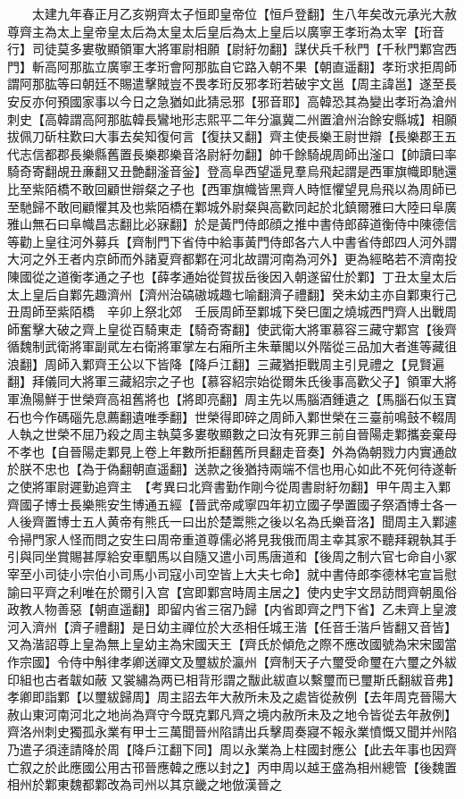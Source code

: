 　　太建九年春正月乙亥朔齊太子恒即皇帝位【恒戶登翻】生八年矣改元承光大赦尊齊主為太上皇帝皇太后為太皇太后皇后為太上皇后以廣寧王孝珩為太宰【珩音行】司徒莫多婁敬顯領軍大將軍尉相願【尉紆勿翻】謀伏兵千秋門【千秋門鄴宫西門】斬高阿那肱立廣寧王孝珩會阿那肱自它路入朝不果【朝直遥翻】孝珩求拒周師謂阿那肱等曰朝廷不賜遣擊賊豈不畏孝珩反邪孝珩若破宇文邕【周主諱邕】遂至長安反亦何預國家事以今日之急猶如此猜忌邪【邪音耶】高韓恐其為變出孝珩為滄州刺史【高韓謂高阿那肱韓長鸞地形志熙平二年分瀛冀二州置滄州治餘安縣城】相願拔佩刀斫柱歎曰大事去矣知復何言【復扶又翻】齊主使長樂王尉世辯【長樂郡王五代志信都郡長樂縣舊置長樂郡樂音洛尉紆勿翻】帥千餘騎覘周師出滏口【帥讀曰率騎奇寄翻覘丑亷翻又丑艶翻滏音釡】登高阜西望遥見羣烏飛起謂是西軍旗幟即馳還比至紫陌橋不敢回顧世辯粲之子也【西軍旗幟皆黑齊人時恇懼望見烏飛以為周師已至馳歸不敢囘顧懼其及也紫陌橋在鄴城外尉粲與高歡同起於北鎮爾雅曰大陸曰阜廣雅山無石曰阜幟昌志翻比必寐翻】於是黃門侍郎顔之推中書侍郎薛道衡侍中陳德信等勸上皇往河外募兵【齊制門下省侍中給事黃門侍郎各六人中書省侍郎四人河外謂大河之外王者内京師而外諸夏齊都鄴在河北故謂河南為河外】更為經略若不濟南投陳國從之道衡孝通之子也【薛孝通始從賀拔岳後因入朝遂留仕於鄴】丁丑太皇太后太上皇后自鄴先趣濟州【濟州治碻磝城趣七喻翻濟子禮翻】癸未幼主亦自鄴東行己丑周師至紫陌橋　辛卯上祭北郊　壬辰周師至鄴城下癸巳圍之燒城西門齊人出戰周師奮擊大破之齊上皇從百騎東走【騎奇寄翻】使武衛大將軍慕容三藏守鄴宫【後齊循魏制武衛將軍副貮左右衛將軍掌左右廂所主朱華閣以外階從三品加大者進等藏徂浪翻】周師入鄴齊王公以下皆降【降戶江翻】三藏猶拒戰周主引見禮之【見賢遍翻】拜儀同大將軍三藏紹宗之子也【慕容紹宗始從爾朱氏後事高歡父子】領軍大將軍漁陽鮮于世榮齊高祖舊將也【將即亮翻】周主先以馬腦酒鍾遺之【馬腦石似玉寶石也今作碼碯先息薦翻遺唯季翻】世榮得即碎之周師入鄴世榮在三臺前鳴鼓不輟周人執之世榮不屈乃殺之周主執莫多婁敬顯數之曰汝有死罪三前自晉陽走鄴攜妾棄母不孝也【自晉陽走鄴見上卷上年數所拒翻舊所貝翻走音奏】外為偽朝戮力内實通啟於朕不忠也【為于偽翻朝直遥翻】送款之後猶持兩端不信也用心如此不死何待遂斬之使將軍尉遲勤追齊主　【考異曰北齊書勤作剛今從周書尉紆勿翻】甲午周主入鄴齊國子博士長樂熊安生博通五經【晉武帝咸寧四年初立國子學置國子祭酒博士各一人後齊置博士五人黄帝有熊氏一曰出於楚鬻熊之後以名為氏樂音洛】聞周主入鄴遽令掃門家人怪而問之安生曰周帝重道尊儒必將見我俄而周主幸其家不聽拜親執其手引與同坐賞賜甚厚給安車駟馬以自隨又遣小司馬唐道和【後周之制六官七命自小冢宰至小司徒小宗伯小司馬小司寇小司空皆上大夫七命】就中書侍郎李德林宅宣旨慰諭曰平齊之利唯在於爾引入宫【宫即鄴宫時周主居之】使内史宇文昂訪問齊朝風俗政教人物善惡【朝直遥翻】即留内省三宿乃歸【内省即齊之門下省】乙未齊上皇渡河入濟州【濟子禮翻】是日幼主禪位於大丞相任城王湝【任音壬湝戶皆翻又音皆】又為湝詔尊上皇為無上皇幼主為宋國天王【齊氏於傾危之際不應改國號為宋宋國當作宗國】令侍中斛律孝卿送禪文及璽紱於瀛州【齊制天子六璽受命璽在六璽之外紱印組也古者韍如蔽又裳繡為两已相背形謂之黻此紱直以繫璽而已璽斯氏翻紱音弗】孝卿即詣鄴【以璽紱歸周】周主詔去年大赦所未及之處皆從赦例【去年周克晉陽大赦山東河南河北之地尚為齊守今既克鄴凡齊之境内赦所未及之地令皆從去年赦例】齊洛州刺史獨孤永業有甲士三萬聞晉州陷請出兵擊周奏寢不報永業憤慨又聞并州陷乃遣子須逹請降於周【降戶江翻下同】周以永業為上柱國封應公【此去年事也因齊亡叙之於此應國公用古邗晉應韓之應以封之】丙申周以越王盛為相州總管【後魏置相州於鄴東魏都鄴改為司州以其京畿之地倣漢晉之